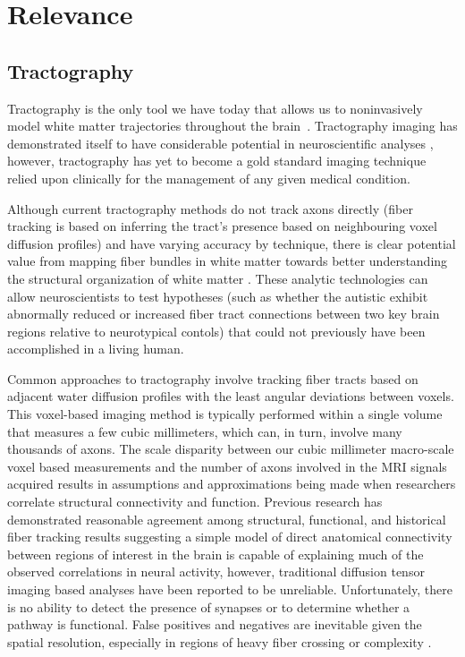 \section{Relevance}
\label{sec:relevance}

\subsection{Tractography}
Tractography is the only tool we have today that allows us to noninvasively 
model white matter trajectories throughout the brain~\cite {jba2011}. 
Tractography imaging has demonstrated itself to have considerable potential in 
neuroscientific analyses \cite {johansenm} \cite {taha} \cite {kreilkamp}, 
however, tractography has yet to become a gold standard imaging technique relied 
upon clinically for the management of any given medical condition.

Although current tractography methods do not track axons directly (fiber 
tracking is based on inferring the tract’s presence based on neighbouring voxel 
diffusion profiles) and have varying accuracy by technique, there is clear 
potential value from mapping fiber bundles in white matter towards better 
understanding the structural organization of white matter \cite {garyfallidis} 
\cite {odonnell}.  These analytic technologies can allow neuroscientists to test 
hypotheses (such as whether the autistic exhibit abnormally reduced or increased 
fiber tract connections between two key brain regions relative to neurotypical 
contols) that could not previously have been accomplished in a living human.

Common approaches to tractography involve tracking fiber tracts based on 
adjacent water diffusion profiles with the least angular deviations between 
voxels. This voxel-based imaging method is typically performed within a single 
volume that measures a few cubic millimeters, which can, in turn, involve many 
thousands of axons.  The scale disparity between our cubic millimeter 
macro-scale voxel based measurements and the number of axons involved in the 
MRI signals acquired results in assumptions and approximations being made when 
researchers correlate structural connectivity and function. Previous research 
has demonstrated reasonable agreement among structural, functional, and 
historical fiber tracking results suggesting a simple model of direct anatomical 
connectivity between regions of interest in the brain is capable of explaining 
much of the observed correlations in neural activity\cite {zhang}, however, 
traditional diffusion tensor imaging based analyses have been reported to be 
unreliable\cite {farq2013}\cite {jba2011}.  Unfortunately, there is no ability 
to detect the presence of synapses or to determine whether a pathway is 
functional. False positives and negatives are inevitable given the spatial 
resolution, especially in regions of heavy fiber crossing or complexity
\cite {johansenm}.

